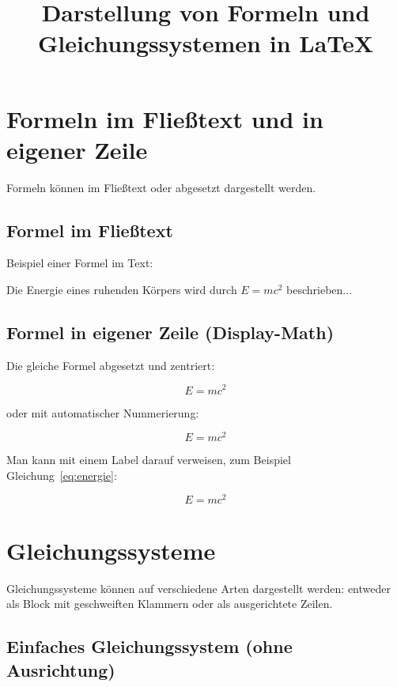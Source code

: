 \documentclass[a4paper,12pt]{article}
\title{Darstellung von Formeln und Gleichungssystemen in \LaTeX}
\author{}
\date{}
\begin{document}
\maketitle

\tableofcontents
\newpage

\section{Formeln im Fließtext und in eigener Zeile}

Formeln können im Fließtext oder abgesetzt dargestellt werden.

\subsection{Formel im Fließtext}

Beispiel einer Formel im Text:

\noindent Die Energie eines ruhenden Körpers wird durch $E = mc^2$ beschrieben...

\subsection{Formel in eigener Zeile (Display-Math)}

Die gleiche Formel abgesetzt und zentriert:

\[
E = mc^2
\]

\noindent oder mit automatischer Nummerierung:

\begin{equation}
E = mc^2
\end{equation}

\noindent Man kann mit einem Label darauf verweisen, zum Beispiel Gleichung~\eqref{eq:energie}:

\begin{equation}
E = mc^2
\label{eq:energie}
\end{equation}

\section{Gleichungssysteme}

Gleichungssysteme können auf verschiedene Arten dargestellt werden:
entweder als Block mit geschweiften Klammern oder als ausgerichtete Zeilen.

\subsection{Einfaches Gleichungssystem (ohne Ausrichtung)}
\end{document}

